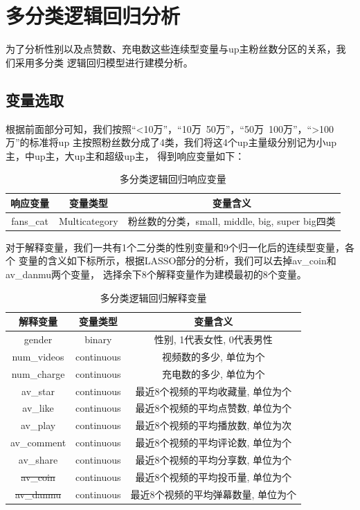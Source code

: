 \documentclass{ctexart}
\begin{document}
\section{多分类逻辑回归分析}

为了分析性别以及点赞数、充电数这些连续型变量与up主粉丝数分区的关系，我们采用多分类
逻辑回归模型进行建模分析。

\subsection{变量选取}

根据前面部分可知，我们按照“<10万”，“10万~50万”，“50万~100万”，“>100万”的标准将up
主按照粉丝数分成了4类，我们将这4个up主量级分别记为小up主，中up主，大up主和超级up主，
得到响应变量如下：
\begin{table}[H]
    \centering
    \begin{tabular}{ccc}
        \toprule
         响应变量 & 变量类型 & 变量含义  \\
        \midrule
         fans\_cat & Multicategory & 粉丝数的分类，small, middle, big, super big四类 \\
        \bottomrule
    \end{tabular}
    \caption{多分类逻辑回归响应变量}
\end{table}

对于解释变量，我们一共有1个二分类的性别变量和9个归一化后的连续型变量，各个
变量的含义如下标所示，根据LASSO部分的分析，我们可以去掉av\_coin和av\_danmu两个变量，
选择余下8个解释变量作为建模最初的8个变量。

\begin{table}[H]
    \centering
    \begin{tabular}{ccc}
        \toprule
          解释变量 & 变量类型 & 变量含义  \\
        \midrule
          gender & binary & 性别, 1代表女性, 0代表男性 \\
          num\_videos & continuous & 视频数的多少, 单位为个\\
          num\_charge & continuous & 充电数的多少, 单位为个\\
          av\_star & continuous & 最近8个视频的平均收藏量, 单位为个\\
          av\_like & continuous & 最近8个视频的平均点赞数, 单位为个\\
          av\_play & continuous & 最近8个视频的平均播放数, 单位为次\\
          av\_comment & continuous & 最近8个视频的平均评论数, 单位为个\\
          av\_share & continuous & 最近8个视频的平均分享数, 单位为个\\
          \sout{av\_coin} & continuous & 最近8个视频的平均投币量, 单位为个\\
          \sout{av\_danmu} & continuous & 最近8个视频的平均弹幕数量, 单位为个\\
        \bottomrule
     \end{tabular}
    \caption{多分类逻辑回归解释变量}
\end{table}
\end{document}
